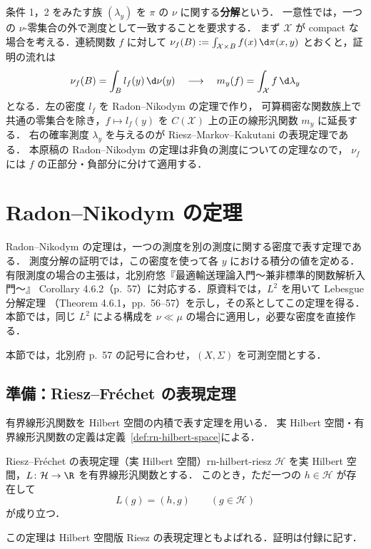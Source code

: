 条件 1，2 をみたす族 $(\lambda_y)$ を $\pi$ の $\nu$ に関する\textbf{分解}という．
一意性では，一つの $\nu$-零集合の外で測度として一致することを要求する．
まず $\mathcal{X}$ が compact な場合を考える．連続関数 $f$ に対して
$\nu_f(B):=\int_{\mathcal{X}\times B}f(x)\,\d\pi(x,y)$ とおくと，証明の流れは
\[
  \nu_f(B)=\int_B l_f(y)\,\d\nu(y)
  \quad\longrightarrow\quad
  m_y(f)=\int_{\mathcal{X}} f\,\d\lambda_y
\]
となる．左の密度 $l_f$ を Radon--Nikodym の定理で作り，
可算稠密な関数族上で共通の零集合を除き，$f\mapsto l_f(y)$ を
$C(\mathcal{X})$ 上の正の線形汎関数 $m_y$ に延長する．
右の確率測度 $\lambda_y$ を与えるのが Riesz--Markov--Kakutani の表現定理である．
本原稿の Radon--Nikodym の定理は非負の測度についての定理なので，
$\nu_f$ には $f$ の正部分・負部分に分けて適用する．

\section{Radon--Nikodym の定理}
\label{sec:dis-radon-nikodym}

Radon--Nikodym の定理は，一つの測度を別の測度に関する密度で表す定理である．
測度分解の証明では，この密度を使って各 $y$ における積分の値を定める．
有限測度の場合の主張は，北別府悠『最適輸送理論入門〜兼非標準的関数解析入門〜』
Corollary 4.6.2（p.~57）に対応する．原資料では，$L^2$ を用いて Lebesgue 分解定理
（Theorem 4.6.1，pp.~56--57）を示し，その系としてこの定理を得る．
本節では，同じ $L^2$ による構成を $\nu\ll\mu$ の場合に適用し，必要な密度を直接作る．

本節では，北別府 p.~57 の記号に合わせ，$(X,\Sigma)$ を可測空間とする．

\subsection{準備：Riesz--Fréchet の表現定理}

有界線形汎関数を Hilbert 空間の内積で表す定理を用いる．
実 Hilbert 空間・有界線形汎関数の定義は定義~\ref{def:rn-hilbert-space}による．

\begin{theorem}{Riesz--Fréchet の表現定理（実 Hilbert 空間）}{rn-hilbert-riesz}
  $\mathcal{H}$ を実 Hilbert 空間，$L\colon\mathcal{H}\to\R$ を有界線形汎関数とする．
  このとき，ただ一つの $h\in\mathcal{H}$ が存在して
  \[
    L(g)=(h,g)\qquad(g\in\mathcal{H})
  \]
  が成り立つ．
\end{theorem}

この定理は Hilbert 空間版 Riesz の表現定理ともよばれる．証明は付録に記す．


